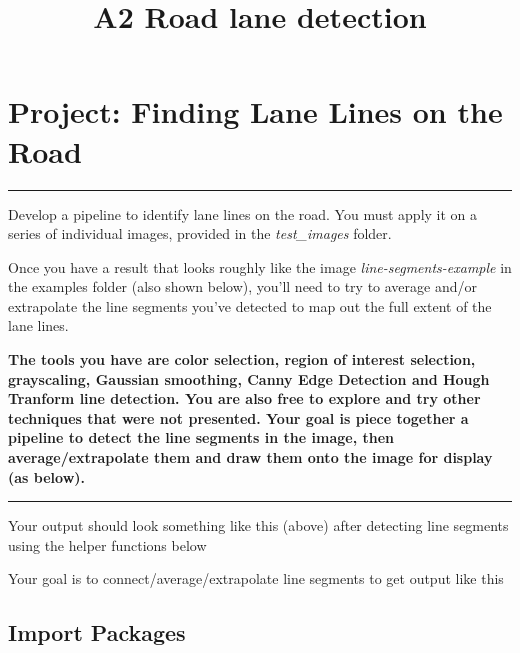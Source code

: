 \documentclass[11pt]{article}
\title{A2 Road lane detection}
\begin{document}
    
    
    \maketitle
    
    

    
    \hypertarget{project-finding-lane-lines-on-the-road}{%
\section{\texorpdfstring{Project: \textbf{Finding Lane Lines on the
Road}}{Project: Finding Lane Lines on the Road}}\label{project-finding-lane-lines-on-the-road}}

\begin{center}\rule{0.5\linewidth}{\linethickness}\end{center}

Develop a pipeline to identify lane lines on the road. You must apply it
on a series of individual images, provided in the \emph{test\_images}
folder.

Once you have a result that looks roughly like the image
\emph{line-segments-example} in the examples folder (also shown below),
you'll need to try to average and/or extrapolate the line segments
you've detected to map out the full extent of the lane lines.

    \textbf{The tools you have are color selection, region of interest
selection, grayscaling, Gaussian smoothing, Canny Edge Detection and
Hough Tranform line detection. You are also free to explore and try
other techniques that were not presented. Your goal is piece together a
pipeline to detect the line segments in the image, then
average/extrapolate them and draw them onto the image for display (as
below).}

\begin{center}\rule{0.5\linewidth}{\linethickness}\end{center}

Your output should look something like this (above) after detecting line
segments using the helper functions below

Your goal is to connect/average/extrapolate line segments to get output
like this

    \hypertarget{import-packages}{%
\subsection{Import Packages}\label{import-packages}}
\end{document}

